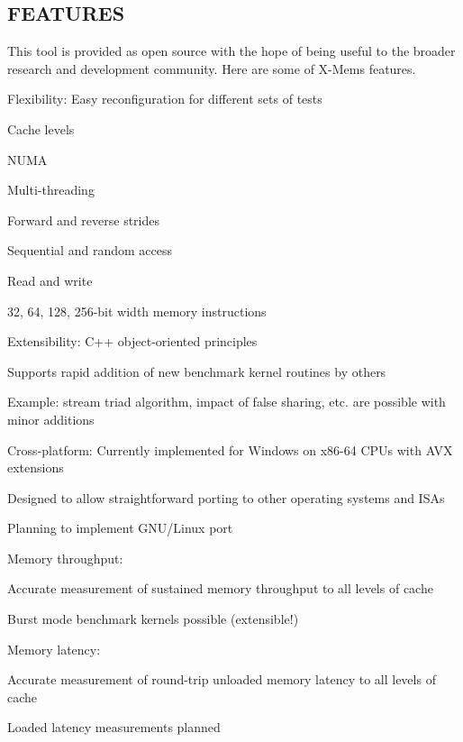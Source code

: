  \subsection*{F\+E\+A\+T\+U\+R\+E\+S }

This tool is provided as open source with the hope of being useful to the broader research and development community. Here are some of X-\/\+Mem\textquotesingle{}s features.

Flexibility\+: Easy reconfiguration for different sets of tests
\begin{DoxyItemize}
\item Cache levels
\item N\+U\+M\+A
\item Multi-\/threading
\item Forward and reverse strides
\item Sequential and random access
\item Read and write
\item 32, 64, 128, 256-\/bit width memory instructions
\end{DoxyItemize}

Extensibility\+: C++ object-\/oriented principles
\begin{DoxyItemize}
\item Supports rapid addition of new benchmark kernel routines by others
\item Example\+: stream triad algorithm, impact of false sharing, etc. are possible with minor additions
\end{DoxyItemize}

Cross-\/platform\+: Currently implemented for Windows on x86-\/64 C\+P\+Us with A\+V\+X extensions
\begin{DoxyItemize}
\item Designed to allow straightforward porting to other operating systems and I\+S\+As
\item Planning to implement G\+N\+U/\+Linux port
\end{DoxyItemize}

Memory throughput\+:
\begin{DoxyItemize}
\item Accurate measurement of sustained memory throughput to all levels of cache
\item Burst mode benchmark kernels possible (extensible!)
\end{DoxyItemize}

Memory latency\+:
\begin{DoxyItemize}
\item Accurate measurement of round-\/trip unloaded memory latency to all levels of cache
\item Loaded latency measurements planned
\end{DoxyItemize}

